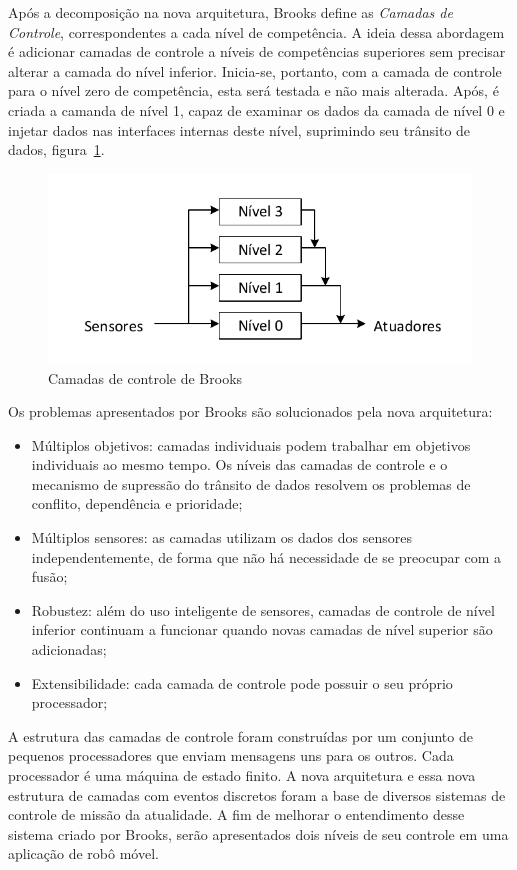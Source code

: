 Após a decomposição na nova arquitetura, Brooks define as \emph{Camadas de
Controle}, correspondentes a cada nível de competência. A ideia dessa abordagem
é adicionar camadas de controle a níveis de competências superiores sem precisar
alterar a camada do nível inferior. Inicia-se, portanto, com a camada de
controle para o nível zero de competência, esta será testada e não mais
alterada. Após, é criada a camanda de nível 1, capaz de examinar os dados
da camada de nível 0 e injetar dados nas interfaces internas deste nível,
suprimindo seu trânsito de dados, figura~\ref{BROOKS_2}.

\begin{figure}[H]
\centering
\includegraphics[width=1\columnwidth]{figs/BROOKS_2.pdf}
\caption{Camadas de controle de Brooks}
\label{BROOKS_2}
\end{figure}

Os problemas apresentados por Brooks são solucionados pela nova arquitetura:
\begin{itemize}
  \item Múltiplos objetivos: camadas individuais podem trabalhar em objetivos
  individuais ao mesmo tempo. Os níveis das camadas de controle e o mecanismo de
  supressão do trânsito de dados resolvem os problemas de conflito, dependência
  e prioridade;
  \item Múltiplos sensores: as camadas utilizam os dados dos sensores
  independentemente, de forma que não há necessidade de se preocupar com a
  fusão;
  \item Robustez: além do uso inteligente de sensores, camadas de controle de
  nível inferior continuam a funcionar quando novas camadas de nível superior
  são adicionadas;
  \item Extensibilidade: cada camada de controle pode possuir o seu próprio
  processador; 
\end{itemize}

A estrutura das camadas de controle foram construídas por um conjunto de
pequenos processadores que enviam mensagens uns para os outros. Cada processador
é uma máquina de estado finito. A nova arquitetura e essa nova estrutura de
camadas com eventos discretos foram a base de diversos sistemas de controle de
missão da atualidade. A fim de melhorar o entendimento desse sistema criado
por Brooks, serão apresentados dois níveis de seu controle em uma aplicação de robô
móvel.

